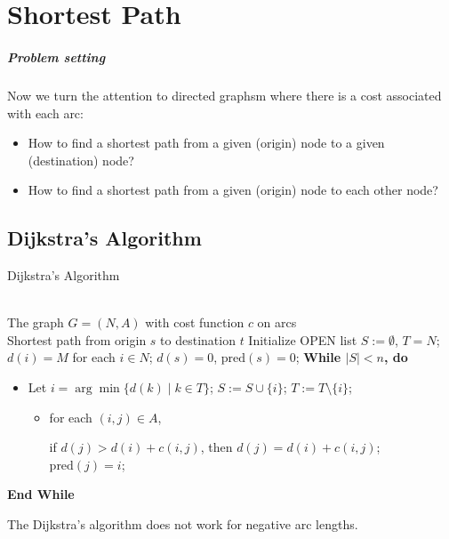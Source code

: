 \chapter{Shortest Path}
\paragraph{Problem setting}
Now we turn the attention to directed graphsm where there is a cost associated with each arc:
\begin{itemize}
\item
How to find a shortest path from a given (origin) node to a given (destination) node?
\item
How to find a shortest path from a given (origin) node to each other node?
\end{itemize}
\section{Dijkstra's Algorithm}
\begin{algorithm}[htb] 
\caption{Dijkstra's Algorithm} 
\label{alg:SM} 
\begin{algorithmic}[1] %
\REQUIRE ~~\\ %
The graph $G=(N,A)$ with cost function $c$ on arcs
\ENSURE ~~\\ %
Shortest path from origin $s$ to destination $t$
\STATE 
Initialize OPEN list $S:=\emptyset$, $T= N$; $d(i)=M$ for each $i\in N$; $d(s)=0$, $\text{pred}(s)=0$;
\STATE
\textbf{While $|S|<n$, do}
\begin{itemize}
\item
Let $i=\arg\min\{d(k)\mid k\in T\}$; $S:=S\cup\{i\}$; $T:=T\setminus\{i\}$;
\begin{itemize}
\item
for each $(i,j)\in A$,

if $d(j)>d(i)+c(i,j)$, then $d(j)= d(i)+c(i,j)$; $\text{pred}(j)=i$;
\end{itemize}
\end{itemize}
\textbf{End While}
\end{algorithmic}
\end{algorithm}

\begin{remark}
The Dijkstra’s algorithm does not work for negative arc lengths.
\end{remark}
